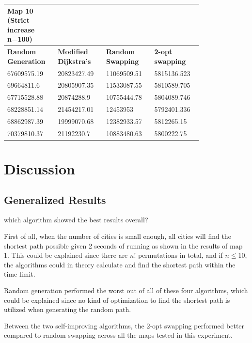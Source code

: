\documentclass{article}
\begin{document}
\begin{table}[H]
    \centering
    \begin{tabular}{|p{0.2\linewidth}|p{0.2\linewidth}|p{0.2\linewidth}|p{0.2\linewidth}|}
    \hline
        \textbf{Map 10 (Strict increase n=100)} & ~ & ~ & ~ \\ \hline
        \textbf{Random Generation} & \textbf{Modified Dijkstra's} & \textbf{Random Swapping} & \textbf{2-opt swapping} \\ \hline
        67609575.19 & 20823427.49 & 11069509.51 & 5815136.523 \\ \hline
        69664811.6 & 20805907.35 & 11533087.55 & 5810589.705 \\ \hline
        67715528.88 & 20874288.9 & 10755444.78 & 5804089.746 \\ \hline
        68228851.14 & 21454217.01 & 12453953 & 5792401.336 \\ \hline
        68862987.39 & 19999070.68 & 12382933.57 & 5812265.15 \\ \hline
        70379810.37 & 21192230.7 & 10883480.63 & 5800222.75 \\ \hline
    \end{tabular}
\end{table}



\newpage


\section{Discussion}\label{sec4}

\subsection{Generalized Results}\label{subsec1}
which algorithm showed the best results overall?

First of all, when the number of cities is small enough, all cities will find the shortest path possible given 2 seconds of running as shown in the results of map 1. This could be explained since there are $n!$ permutations in total, and if $n\leq 10$, the algorithms could in theory calculate and find the shortest path within the time limit.

Random generation performed the worst out of all of these four algorithms, which could be explained since no kind of optimization to find the shortest path is utilized when generating the random path. 

Between the two self-improving algorithms, the 2-opt swapping performed better compared to random swapping across all the maps tested in this experiment. 
\end{document}
